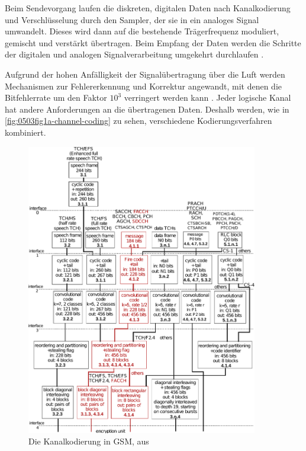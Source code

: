 Beim Sendevorgang laufen die diskreten, digitalen Daten nach Kanalkodierung und Verschlüsselung durch den Sampler, der sie in ein analoges Signal umwandelt. Dieses wird dann auf die bestehende Trägerfrequenz moduliert, gemischt und verstärkt übertragen. Beim Empfang der Daten werden die Schritte der digitalen und analogen Signalverarbeitung umgekehrt durchlaufen \citep{zoudigital}.

Aufgrund der hohen Anfälligkeit der Signalübertragung über die Luft werden Mechanismen zur Fehlererkennung und Korrektur angewandt, mit denen die Bitfehlerrate um den Faktor $10^{3}$ verringert werden kann \citep[Kap. 4.8]{eberspacher:2008:gsm-architecture}. Jeder logische Kanal hat andere Anforderungen an die übertragenen Daten. Deshalb werden, wie in \autoref{fig:0503fig1a-channel-coding} zu sehen, verschiedene Kodierungsverfahren kombiniert.

\begin{figure}[H]
  \begin{center}
    \includegraphics[width=0.9\textwidth]{figures/0503_fig_1a.pdf}
  \end{center}
  \caption[Die Kanalkodierung in GSM]{Die Kanalkodierung in \ac{GSM}, aus } \label{fig:0503fig1a-channel-coding} 
\end{figure}

